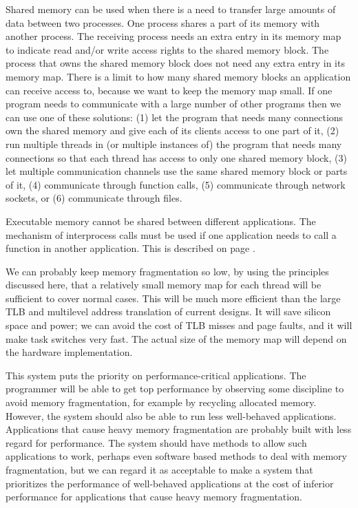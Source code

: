 \documentclass[forwardcom.tex]{subfiles}
\begin{document}
\label{sharedMemory} Shared memory can be used when there is a need to transfer large amounts of data between two processes. One process shares a part of its memory with another process. The receiving process needs an extra entry in its memory map to indicate read and/or write access rights to the shared memory block. The process that owns the shared memory block does not need any extra entry in its memory map. There is a limit to how many shared memory blocks an application can receive access to, because we want to keep the memory map small. If one program needs to communicate with a large number of other programs then we can use one of these solutions: (1) let the program that needs many connections own the shared memory and give each of its clients access to one part of it, (2) run multiple threads in (or multiple instances of) the program that needs many connections so that each thread has access to only one shared memory block, (3) let multiple communication channels use the same shared memory block or parts of it, (4) communicate through function calls, (5) communicate through network sockets, or (6) communicate through files. 
\vspace{2mm}

Executable memory cannot be shared between different applications. The mechanism of interprocess calls must be used if one application needs to call a function in another application. This is described on page \pageref{interProcessCalls}. 
\vspace{2mm}

We can probably keep memory fragmentation so low, by using the principles discussed here, that a relatively small memory map for each thread will be sufficient to cover normal cases. This will be much more efficient than the large TLB and multilevel address translation of current designs. It will save silicon space and power; we can avoid the cost of TLB misses and page faults, and it will make task switches very fast. The actual size of the memory map will depend on the hardware implementation.
\vspace{2mm}

This system puts the priority on performance-critical applications. The programmer will be able to get top performance by observing some discipline to avoid memory fragmentation, for example by recycling allocated memory. However, the system should also be able to run less well-behaved applications. Applications that cause heavy memory fragmentation are probably built with less regard for performance. The system should have methods to allow such applications to work, perhaps even software based methods to deal with memory fragmentation, but we can regard it as acceptable to make a system that prioritizes the performance of well-behaved applications at the cost of inferior performance for applications that cause heavy memory fragmentation.
\end{document}
